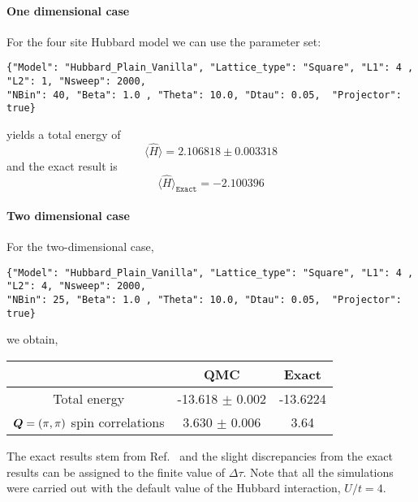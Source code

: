 \paragraph{One dimensional case} 

For the four site Hubbard model  we can use the parameter set:
 \begin{lstlisting}[style=fortran]
{"Model": "Hubbard_Plain_Vanilla", "Lattice_type": "Square", "L1": 4 , "L2": 1, "Nsweep": 2000,  
"NBin": 40, "Beta": 1.0 , "Theta": 10.0, "Dtau": 0.05,  "Projector": true}
\end{lstlisting}
yields a total energy of 
\begin{equation*}
       \langle  \hat{H}   \rangle = 2.106818     \pm   0.003318
\end{equation*}
and the exact result is  
\begin{equation*}
\langle  \hat{H}   \rangle_{\texttt{Exact}}    = -2.100396
\end{equation*}

\paragraph{Two dimensional case}  
For the two-dimensional case, 
\begin{lstlisting}[style=fortran]
{"Model": "Hubbard_Plain_Vanilla", "Lattice_type": "Square", "L1": 4 , "L2": 4, "Nsweep": 2000,  
"NBin": 25, "Beta": 1.0 , "Theta": 10.0, "Dtau": 0.05,  "Projector": true}
\end{lstlisting}
we obtain, \\
\begin{center}
\begin{tabular}{|c|c|c|}
\hline
                  &   QMC  & Exact  \\ \hline
Total energy & -13.618   $\pm $  0.002 &  -13.6224  \\ \hline
 $\boldsymbol{Q}=(\pi,\pi)$ spin correlations &  3.630     $ \pm $   0.006     & 3.64 \\ 
 \hline 
\end{tabular}
 \end{center}
 The exact results stem from Ref.~\cite{Parola91}     and the slight discrepancies from the exact results can be  assigned to the finite value of $\Delta \tau$.  Note that all the simulations were carried out with the default value of the Hubbard interaction, $U/t =4$. 
